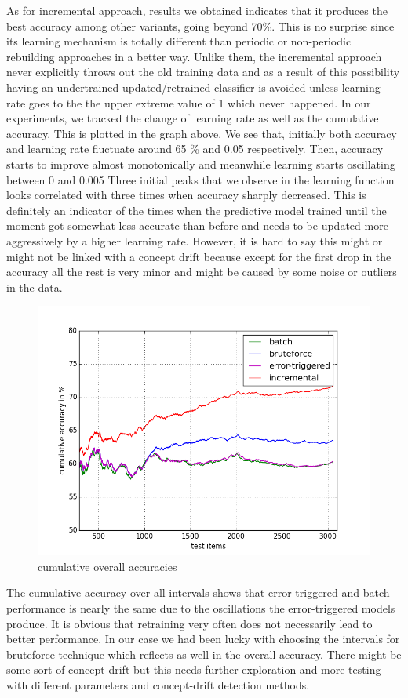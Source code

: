 \documentclass{article} %
\begin{document}
As for incremental approach, results we obtained indicates that it produces the best accuracy among other variants, going beyond 70\%. This is no surprise since its learning mechanism is totally different than periodic or non-periodic rebuilding approaches in a better way. Unlike them, the incremental approach never explicitly throws out the old training data and as a result of this possibility having an undertrained updated/retrained classifier is avoided unless learning rate goes to the the upper extreme value of 1 which never happened. In our experiments, we tracked the change of learning rate as well as the cumulative accuracy. This is plotted in the graph above. We see that, initially both accuracy and learning rate fluctuate around 65 \% and 0.05 respectively. Then, accuracy starts to improve almost monotonically and meanwhile learning starts oscillating between 0 and 0.005   Three initial peaks that we observe in the learning function looks correlated with three times when accuracy sharply decreased. This is definitely an indicator of the times when the predictive model trained until the moment got somewhat less accurate than before and needs to be updated more aggressively by a higher learning rate. However, it is hard to say this might or might not be linked with a concept drift because except for the first drop in the accuracy all the rest is very minor and might be caused by some noise or outliers in the data.


 \begin{figure}[htbp]
  \centering
  \includegraphics[scale=0.5]{./plots/allAcc.png}
  \caption{cumulative overall accuracies}
\end{figure}
The cumulative accuracy over all intervals shows that error-triggered and batch performance is nearly the same due to the oscillations the error-triggered models produce. It is obvious that retraining very often does not necessarily lead to better performance. In our case we had been lucky with choosing the intervals for bruteforce technique which reflects as well in the overall accuracy. There might be some sort of concept drift but this needs further exploration and more testing with different parameters and concept-drift detection methods.
\end{document}
